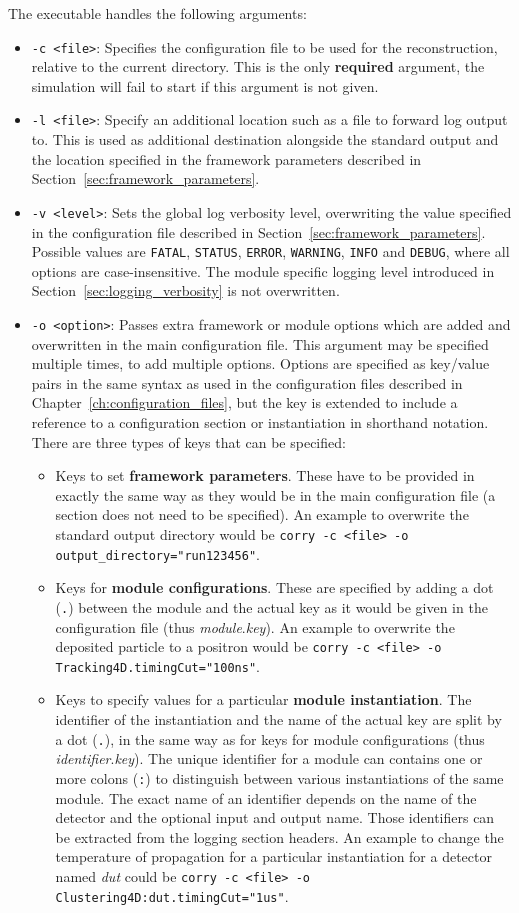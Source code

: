 The executable handles the following arguments:
\begin{itemize}
\item \texttt{-c <file>}: Specifies the configuration file to be used for the reconstruction, relative to the current directory.
This is the only \textbf{required} argument, the simulation will fail to start if this argument is not given.
\item \texttt{-l <file>}: Specify an additional location such as a file to forward log output to. This is used as additional destination alongside the standard output and the location specified in the framework parameters described in Section~\ref{sec:framework_parameters}.
\item \texttt{-v <level>}: Sets the global log verbosity level, overwriting the value specified in the configuration file described in Section~\ref{sec:framework_parameters}.
Possible values are \texttt{FATAL}, \texttt{STATUS}, \texttt{ERROR}, \texttt{WARNING}, \texttt{INFO} and \texttt{DEBUG}, where all options are case-insensitive.
The module specific logging level introduced in Section~\ref{sec:logging_verbosity} is not overwritten.
\item \texttt{-o <option>}: Passes extra framework or module options which are added and overwritten in the main configuration file.
This argument may be specified multiple times, to add multiple options.
Options are specified as key/value pairs in the same syntax as used in the configuration files described in Chapter~\ref{ch:configuration_files}, but the key is extended to include a reference to a configuration section or instantiation in shorthand notation.
There are three types of keys that can be specified:
\begin{itemize}
\item Keys to set \textbf{framework parameters}. These have to be provided in exactly the same way as they would be in the main configuration file (a section does not need to be specified). An example to overwrite the standard output directory would be \texttt{corry -c <file> -o output\_directory="run123456"}.
\item Keys for \textbf{module configurations}. These are specified by adding a dot (\texttt{.}) between the module and the actual key as it would be given in the configuration file (thus \textit{module}.\textit{key}). An example to overwrite the deposited particle to a positron would be \texttt{corry -c <file> -o Tracking4D.timingCut="100ns"}.
\item Keys to specify values for a particular \textbf{module instantiation}. The identifier of the instantiation and the name of the actual key are split by a dot (\texttt{.}), in the same way as for keys for module configurations (thus \textit{identifier}.\textit{key}). The unique identifier for a module can contains one or more colons (\texttt{:}) to distinguish between various instantiations of the same module. The exact name of an identifier depends on the name of the detector and the optional input and output name. Those identifiers can be extracted from the logging section headers. An example to change the temperature of propagation for a particular instantiation for a detector named \textit{dut} could be \texttt{corry -c <file> -o Clustering4D:dut.timingCut="1us"}.

\end{itemize}
\end{itemize}
